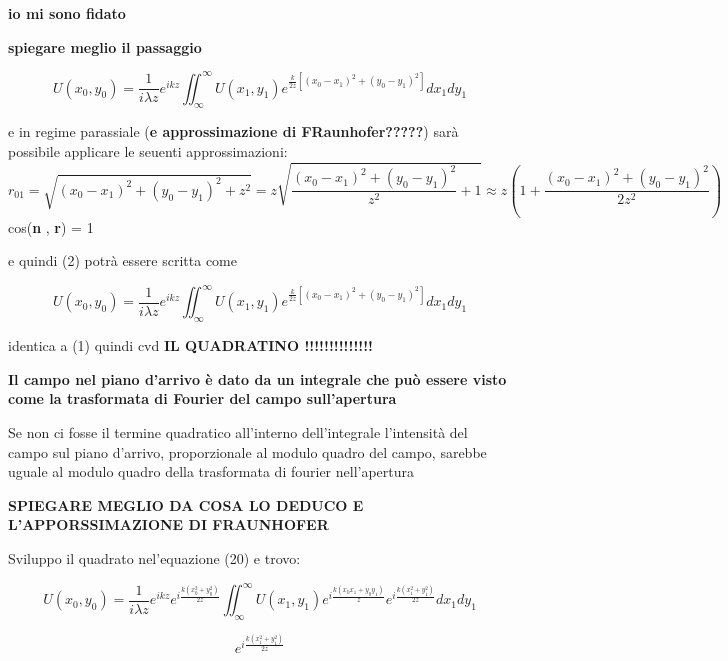 \documentclass{article}
\begin{document}
\textbf{io mi sono fidato}

\textbf{spiegare meglio il passaggio}

\begin{equation}
U(x_{0}, y_{0})= \frac{1}{i \lambda z} e^{i k z}  \iint_{\infty}^{\infty} U(x_{1}, y_{1}) e^{\frac{k}{2z} [(x_{0}- x_{1})^{2} + (y_{0}- y_{1})^{2}]}dx_{1}dy_{1}
\end{equation}

e in regime parassiale (\textbf{e approssimazione di FRaunhofer?????}) sarà possibile applicare le seuenti approssimazioni:
\begin{equation}
r_{01} = \sqrt{(x_{0} - x_{1})^{2} + (y_{0}- y_{1})^{2} + z^{2}} = z \sqrt{\frac{(x_{0} - x_{1})^{2} + (y_{0}- y_{1})^{2}}{z^{2}} + 1} \approx z ( 1 + \frac{(x_{0} - x_{1})^{2} + (y_{0}- y_{1})^{2}}{2 z^{2}})
\end{equation}
cos(\textbf{n} , \textbf{ r})  = 1 

e quindi (2) potrà essere scritta come

\begin{equation}
U(x_{0}, y_{0})= \frac{1}{i \lambda z} e^{i k z}  \iint_{\infty}^{\infty} U(x_{1}, y_{1}) e^{\frac{k}{2z} [(x_{0}- x_{1})^{2} + (y_{0}- y_{1})^{2}]}dx_{1}dy_{1}
\end{equation}

identica a (1) quindi cvd
\textbf{IL QUADRATINO !!!!!!!!!!!!!!}

\textbf{Il campo nel piano d'arrivo è dato da un integrale che può essere visto come la trasformata di Fourier del campo sull'apertura}

Se non ci fosse il termine quadratico all'interno dell'integrale l'intensità del campo sul piano d'arrivo, proporzionale al modulo quadro del campo, sarebbe uguale al modulo quadro della trasformata di fourier nell'apertura

\textbf{SPIEGARE MEGLIO DA COSA LO DEDUCO E L'APPORSSIMAZIONE DI FRAUNHOFER}


Sviluppo il quadrato nel'equazione (20) e trovo:

\begin{equation}
U(x_{0}, y_{0})= \frac{1}{i \lambda z} e^{i k z} e^{i \frac{k (x_{0} ^ {2} + y_{0}^{2})}{2 z}}  \iint_{\infty}^{\infty} U(x_{1}, y_{1}) e^{i \frac{k (x_{0} x_{1} + y_{0} y_{1})}{z} }  e^{i \frac{k ( x_{1}^{2}  +  y_{1}^{2} ) }{2z} } dx_{1}dy_{1}
\end{equation}


\begin{equation}
e^{i \frac{k ( x_{1}^{2}  +  y_{1}^{2} ) }{2z}}
\end{equation}
\end{document}
